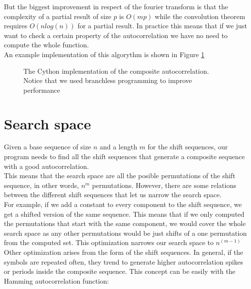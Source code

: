       But the biggest improvement in respect of the fourier transform is that
      the complexity of a partial result of size $p$ is $O(mp)$ while the
      convolution theorem requires $O(nlog(n))$ for a partial result. In
      practice this means that if we just want to check a certain property
      of the autocorrelation we have no need to compute the whole function.\\

      An example implementation of this algorythm is shown in Figure \ref{composite_auto:fig:1}

      \begin{figure}[ht!]
        \caption{The Cython implementation of the composite autocorrelation.
        Notice that we used branchless programming to improve performance}
        \label{composite_auto:fig:1}
      \end{figure}

  \section{Search space}

  Given a base sequence of size $n$ and a length $m$ for the shift sequences,
  our program needs to find all the shift sequences that generate a composite
  sequence with a good autocorrelation.\\

  This means that the search space are all the posible permutations of the
  shift sequence, in other words, $n^m$ permutations. However, there are some
  relations between the different shift sequences that let us narrow the
  search space.\\

  For example, if we add a constant to every component to the shift sequence,
  we get a shifted version of the same sequence. This means that if we only
  computed the permutations that start with the same component, we would cover
  the whole search space as any other permutations would be just shifts of
  a one permutation from the computed set. This optimization narrows our
  search space to $n^{(m-1)}$\\

  Other optimization arises from the form of the shift sequences. In general,
  if the symbols are repeated often, they trend to generate higher
  autocorrelation spikes or periods inside the composite sequence. This
  concept can be easily with the Hamming autocorrelation function:\\

